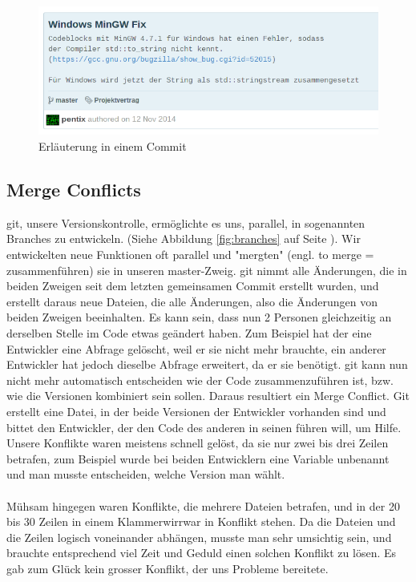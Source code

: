 \documentclass[12pt,a4paper]{scrartcl}
\begin{document}
\begin{figure}[h]
\centering
\includegraphics[scale=0.8]{img/e419eef.png}
\caption{Erläuterung in einem Commit}
\end{figure}

\subsection{Merge Conflicts}
git, unsere Versionskontrolle, ermöglichte es uns, parallel, in sogenannten Branches zu entwickeln. (Siehe Abbildung \ref{fig:branches} auf Seite \pageref{fig:branches}). Wir entwickelten neue Funktionen oft parallel und "mergten" (engl. to merge = zusammenführen) sie in unseren master-Zweig.
git nimmt alle Änderungen, die in beiden Zweigen seit dem letzten gemeinsamen Commit erstellt wurden, und erstellt daraus neue Dateien, die alle Änderungen,
also die Änderungen von beiden Zweigen beeinhalten. Es kann sein, dass nun 2 Personen gleichzeitig an derselben Stelle im Code etwas geändert haben. Zum Beispiel
hat der eine Entwickler eine Abfrage gelöscht, weil er sie nicht mehr brauchte, ein anderer Entwickler hat jedoch dieselbe Abfrage erweitert, da er sie benötigt.
git kann nun nicht mehr automatisch entscheiden wie der Code zusammenzuführen ist, bzw. wie die Versionen kombiniert sein sollen. Daraus resultiert ein Merge
Conflict. Git erstellt eine Datei, in der beide Versionen der Entwickler vorhanden sind und bittet den Entwickler, der den Code des anderen in seinen führen
will, um Hilfe. Unsere Konflikte waren meistens schnell gelöst, da sie nur zwei bis drei Zeilen betrafen, zum Beispiel wurde bei beiden Entwicklern
eine Variable unbenannt und man musste entscheiden, welche Version man wählt.\\
\\
Mühsam hingegen waren Konflikte, die mehrere Dateien betrafen, und in der 20 bis 30 Zeilen in einem Klammerwirrwar in Konflikt stehen. Da die Dateien und die Zeilen
logisch voneinander abhängen, musste man sehr umsichtig sein, und brauchte entsprechend viel Zeit und Geduld einen solchen Konflikt zu lösen. Es gab zum Glück kein
grosser Konflikt, der uns Probleme bereitete.
\newpage
\end{document}
